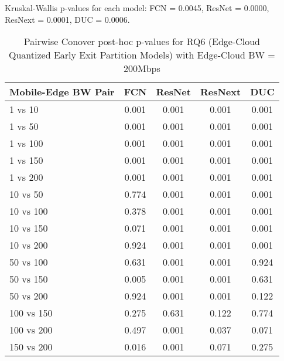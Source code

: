 \begin{table}[h]
\centering
\caption{Pairwise Conover post-hoc p-values for RQ6 (Edge-Cloud Quantized Early Exit Partition Models) with Edge-Cloud BW = 200Mbps}
\label{tab:conover_edge_cloud_quantized_earlyexit_partition_ec200}
\smallskip
Kruskal-Wallis p-values for each model: FCN = 0.0045, ResNet = 0.0000, ResNext = 0.0001, DUC = 0.0006.

\begin{tabular}{lcccc}
\toprule
Mobile-Edge BW Pair & FCN & ResNet & ResNext & DUC \\
\midrule
1 vs 10 & 0.001 & 0.001 & 0.001 & 0.001 \\
1 vs 50 & 0.001 & 0.001 & 0.001 & 0.001 \\
1 vs 100 & 0.001 & 0.001 & 0.001 & 0.001 \\
1 vs 150 & 0.001 & 0.001 & 0.001 & 0.001 \\
1 vs 200 & 0.001 & 0.001 & 0.001 & 0.001 \\
10 vs 50 & 0.774 & 0.001 & 0.001 & 0.001 \\
10 vs 100 & 0.378 & 0.001 & 0.001 & 0.001 \\
10 vs 150 & 0.071 & 0.001 & 0.001 & 0.001 \\
10 vs 200 & 0.924 & 0.001 & 0.001 & 0.001 \\
50 vs 100 & 0.631 & 0.001 & 0.001 & 0.924 \\
50 vs 150 & 0.005 & 0.001 & 0.001 & 0.631 \\
50 vs 200 & 0.924 & 0.001 & 0.001 & 0.122 \\
100 vs 150 & 0.275 & 0.631 & 0.122 & 0.774 \\
100 vs 200 & 0.497 & 0.001 & 0.037 & 0.071 \\
150 vs 200 & 0.016 & 0.001 & 0.071 & 0.275 \\
\bottomrule
\end{tabular}
\end{table}

